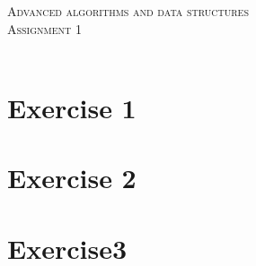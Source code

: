 \documentclass{article}
\begin{document}
\begin{center}
\textsc{\Large Advanced algorithms and data structures}\\[0.5cm]
\textsc{\large Assignment 1}\\[0.5cm]
\textsc{\large }\\[0.5cm]
\vspace{1 cm}
\end{center}

\section*{Exercise 1}

\section*{Exercise 2}





\section*{Exercise3}
\end{document}
